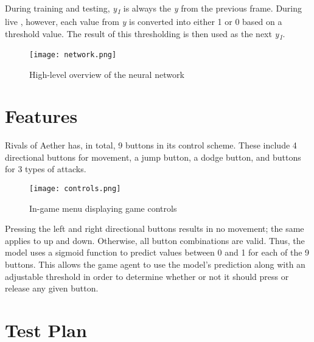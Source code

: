 During training and testing, \textit{y\textsubscript{1}} is always the \textit{y} from the previous frame. During live , however, each value from \textit{y} is converted into either 1 or 0 based on a threshold value. The result of this thresholding is then used as the next \textit{y\textsubscript{1}}.

\begin{figure}
    \caption{High-level overview of the neural network}
    \centering
    \texttt{[image: network.png]} \\
\end{figure}




\section{Features}

Rivals of Aether has, in total, 9 buttons in its control scheme. These include 4 directional buttons for movement, a jump button, a dodge button, and buttons for 3 types of attacks.

\begin{figure}
	\caption{In-game menu displaying game controls}
	\centering
	\texttt{[image: controls.png]} \\
\end{figure}

Pressing the left and right directional buttons results in no movement; the same applies to up and down. Otherwise, all button combinations are valid. Thus, the model uses a sigmoid function to predict values between 0 and 1 for each of the 9 buttons. This allows the game agent to use the model's prediction along with an adjustable threshold in order to determine whether or not it should press or release any given button.




\section{Test Plan}

